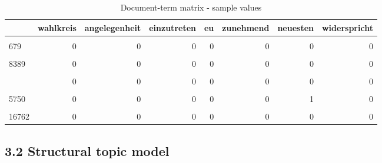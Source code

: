 \documentclass[
  12pt,
]{article}
\begin{document}
\begin{table}[H]

\caption{\label{tab:Document term matrix}Document-term matrix - sample values \label{table:dtm}}
\centering
\fontsize{7}{9}\selectfont
\begin{tabular}[t]{lrrrrrrr}
\toprule
  & wahlkreis & angelegenheit & einzutreten & eu & zunehmend & neuesten & widerspricht\\
\midrule
\cellcolor{gray!6}{4149} & \cellcolor{gray!6}{0} & \cellcolor{gray!6}{0} & \cellcolor{gray!6}{0} & \cellcolor{gray!6}{0} & \cellcolor{gray!6}{0} & \cellcolor{gray!6}{0} & \cellcolor{gray!6}{0}\\
679 & 0 & 0 & 0 & 0 & 0 & 0 & 0\\
\cellcolor{gray!6}{7664} & \cellcolor{gray!6}{0} & \cellcolor{gray!6}{0} & \cellcolor{gray!6}{0} & \cellcolor{gray!6}{0} & \cellcolor{gray!6}{0} & \cellcolor{gray!6}{0} & \cellcolor{gray!6}{0}\\
8389 & 0 & 0 & 0 & 0 & 0 & 0 & 0\\
\cellcolor{gray!6}{8435} & \cellcolor{gray!6}{0} & \cellcolor{gray!6}{0} & \cellcolor{gray!6}{0} & \cellcolor{gray!6}{0} & \cellcolor{gray!6}{0} & \cellcolor{gray!6}{0} & \cellcolor{gray!6}{0}\\
\addlinespace
11293 & 0 & 0 & 0 & 0 & 0 & 0 & 0\\
\cellcolor{gray!6}{9682} & \cellcolor{gray!6}{0} & \cellcolor{gray!6}{0} & \cellcolor{gray!6}{0} & \cellcolor{gray!6}{0} & \cellcolor{gray!6}{0} & \cellcolor{gray!6}{0} & \cellcolor{gray!6}{0}\\
5750 & 0 & 0 & 0 & 0 & 0 & 1 & 0\\
\cellcolor{gray!6}{17056} & \cellcolor{gray!6}{0} & \cellcolor{gray!6}{0} & \cellcolor{gray!6}{0} & \cellcolor{gray!6}{0} & \cellcolor{gray!6}{0} & \cellcolor{gray!6}{0} & \cellcolor{gray!6}{0}\\
16762 & 0 & 0 & 0 & 0 & 0 & 0 & 0\\
\bottomrule
\end{tabular}
\end{table}

\hypertarget{structural-topic-model}{%
\subsection{3.2 Structural topic model}\label{structural-topic-model}}
\end{document}
